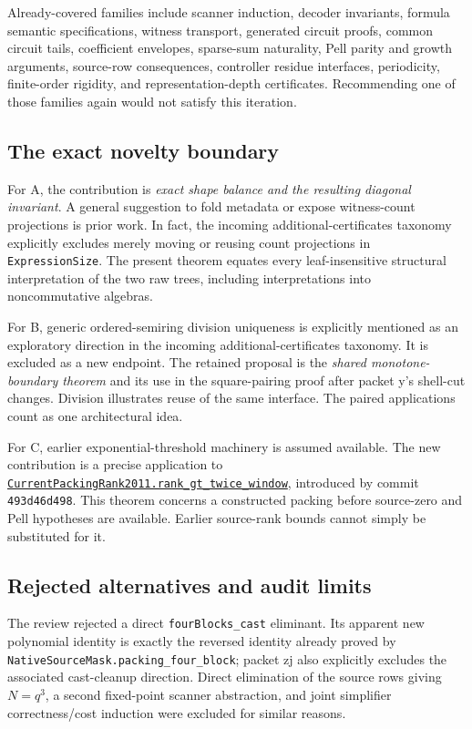 \documentclass[11pt,letterpaper]{article}
\newcommand{\code}[1]{\texttt{\small #1}}
\newcommand{\source}[2]{\href{https://github.com/VladimirReshetnikov/ProveIt/blob/9d9d1123b39927d30363f1dcd53c23f0575c30ee/Computability/DiophantineConsistency/Lean/DiophantineConsistency/#1.lean}{\code{#1.#2}}}
\begin{document}
Already-covered families include scanner induction, decoder invariants, formula semantic specifications, witness transport, generated circuit proofs, common circuit tails, coefficient envelopes, sparse-sum naturality, Pell parity and growth arguments, source-row consequences, controller residue interfaces, periodicity, finite-order rigidity, and representation-depth certificates. Recommending one of those families again would not satisfy this iteration.

\subsection{The exact novelty boundary}

For A, the contribution is \emph{exact shape balance and the resulting diagonal invariant}. A general suggestion to fold metadata or expose witness-count projections is prior work. In fact, the incoming additional-certificates taxonomy explicitly excludes merely moving or reusing count projections in \code{ExpressionSize}. The present theorem equates every leaf-insensitive structural interpretation of the two raw trees, including interpretations into noncommutative algebras.

For B, generic ordered-semiring division uniqueness is explicitly mentioned as an exploratory direction in the incoming additional-certificates taxonomy. It is excluded as a new endpoint. The retained proposal is the \emph{shared monotone-boundary theorem} and its use in the square-pairing proof after packet y's shell-cut changes. Division illustrates reuse of the same interface. The paired applications count as one architectural idea.

For C, earlier exponential-threshold machinery is assumed available. The new contribution is a precise application to \source{CurrentPackingRank2011}{rank\_gt\_twice\_window}, introduced by commit \code{493d46d498}. This theorem concerns a constructed packing before source-zero and Pell hypotheses are available. Earlier source-rank bounds cannot simply be substituted for it.

\subsection{Rejected alternatives and audit limits}

The review rejected a direct \code{fourBlocks\_cast} eliminant. Its apparent new polynomial identity is exactly the reversed identity already proved by \code{NativeSourceMask.packing\_four\_block}; packet zj also explicitly excludes the associated cast-cleanup direction. Direct elimination of the source rows giving $N=q^3$, a second fixed-point scanner abstraction, and joint simplifier correctness/cost induction were excluded for similar reasons.
\end{document}
